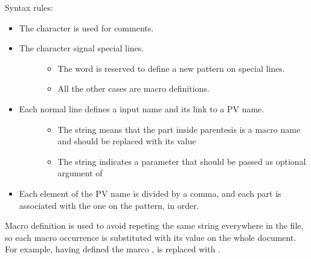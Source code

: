 \documentclass[letterpaper,10pt,english]{sphinxmanual}
\begin{document}
Syntax rules:
\begin{itemize}
\item {} 
The character \sphinxcode{\sphinxupquote{\#}} is used for comments.

\item {} \begin{description}
\item[{The character \sphinxcode{\sphinxupquote{\textgreater{}}} signal special lines.}] \leavevmode\begin{itemize}
\item {} 
The word  is reserved to define a new pattern on special lines.

\item {} 
All the other cases are macro definitions.

\end{itemize}

\end{description}

\item {} \begin{description}
\item[{Each normal line defines a input name and its link to a PV name.}] \leavevmode\begin{itemize}
\item {} 
The \sphinxcode{\sphinxupquote{\$( )}} string means that the part inside parentesis is a macro name and should be replaced with its value

\item {} 
The \sphinxcode{\sphinxupquote{\textless{} \textgreater{}}} string indicates a parameter that should be passed as optional argument of {\hyperref[\detokenize{fsm:connect}]{}}

\end{itemize}

\end{description}

\item {} 
Each element of the PV name is divided by a comma, and each part is associated with the one on the pattern, in order.

\end{itemize}

Macro definition is used to avoid repeting the same string everywhere in the
file, so each macro occurrence is substituted with its value on the whole
document. For example, having defined the marco , 
is replaced with .
\end{document}
